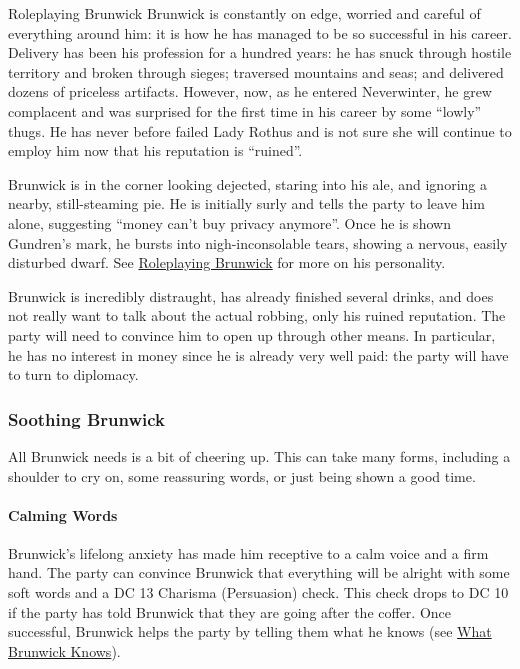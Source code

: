 \documentclass[10pt,twocolumn,openany,nodeprecatedcode,bg=none,inline]{dndbook}
\begin{document}
\begin{DndSidebar}[float=b]{Roleplaying Brunwick}
  \label{rol:brunwick}
  Brunwick is constantly on edge, worried and careful of everything around him: it is how he has managed to be so successful in his career.
  Delivery has been his profession for a hundred years: he has snuck through hostile territory and broken through sieges; traversed mountains and seas; and delivered dozens of priceless artifacts.
  However, now, as he entered Neverwinter, he grew complacent and was surprised for the first time in his career by some ``lowly'' thugs.
  He has never before failed Lady Rothus and is not sure she will continue to employ him now that his reputation is ``ruined''.
\end{DndSidebar}

Brunwick is in the corner looking dejected, staring into his ale, and ignoring a nearby, still-steaming pie.
He is initially surly and tells the party to leave him alone, suggesting ``money can't buy privacy anymore''.
Once he is shown Gundren's mark, he bursts into nigh-inconsolable tears, showing a nervous, easily disturbed dwarf.
See \hyperref[rol:brunwick]{Roleplaying Brunwick} for more on his personality.

Brunwick is incredibly distraught, has already finished several drinks, and does not really want to talk about the actual robbing, only his ruined reputation.
The party will need to convince him to open up through other means.
In particular, he has no interest in money since he is already very well paid: the party will have to turn to diplomacy.

\subsubsection{Soothing Brunwick}
All Brunwick needs is a bit of cheering up.
This can take many forms, including a shoulder to cry on, some reassuring words, or just being shown a good time.

\paragraph{Calming Words}
Brunwick's lifelong anxiety has made him receptive to a calm voice and a firm hand.
The party can convince Brunwick that everything will be alright with some soft words and a DC 13 Charisma (Persuasion) check.
This check drops to DC 10 if the party has told Brunwick that they are going after the coffer.
Once successful, Brunwick helps the party by telling them what he knows (see \hyperref[sec:brunwickKnows]{What Brunwick Knows}).
\end{document}
